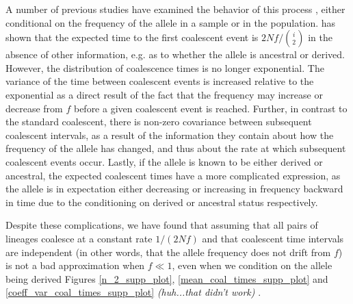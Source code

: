 \documentclass[a4paper,10pt]{article}
\newcommand{\jb}[1]{{\it\color{blue} (#1)} }
\begin{document}

A number of previous studies have examined the behavior of this process \citep{Wiuf1999,Wiuf:2000js,Patterson2005}, either conditional on the frequency of the allele in a sample or in the population. \cite{Wiuf:2000js} has shown that the expected time to the first coalescent event is $2 N f/ {i \choose 2}$ in the absence of other information, e.g. as to whether the allele is ancestral or derived. However, the distribution of coalescence times is no longer exponential. The variance of the time between coalescent events is increased relative to the exponential as a direct result of the fact that the frequency may increase or decrease from $f$ before a given coalescent event is reached. Further, in contrast to the standard coalescent, there is non-zero covariance between subsequent coalescent intervals, as a result of the information they contain about how the frequency of the allele has changed, and thus about the rate at which subsequent coalescent events occur. Lastly, if the allele is known to be either derived or ancestral, the expected coalescent times have a more complicated expression, as the allele is in expectation either decreasing or increasing in frequency backward in time due to the conditioning on derived or ancestral status respectively.

Despite these complications, we have found that assuming that all pairs of lineages coalesce at a constant rate $1/(2 N f)$ and that coalescent time intervals are independent (in other words, that the allele frequency does not drift from $f$) is not a bad approximation when $f \ll 1$, even when we condition on the allele being derived Figures \ref{n_2_supp_plot}, \ref{mean_coal_times_supp_plot} and \ref{coeff_var_coal_times_supp_plot} \jb{huh...that didn't work}.
\end{document}

